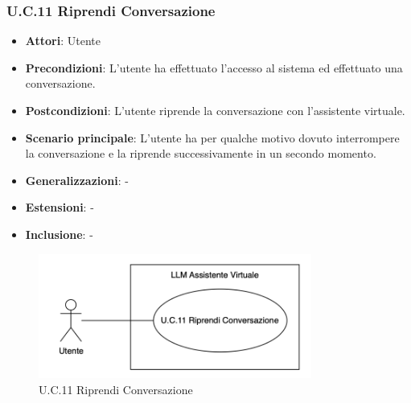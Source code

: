 \subsubsection{U.C.11 Riprendi Conversazione}
\begin{itemize}
    \item \textbf{Attori}: Utente
    \item \textbf{Precondizioni}: L’utente ha effettuato l’accesso al sistema ed effettuato una conversazione.
    \item \textbf{Postcondizioni}: L’utente riprende la conversazione con l’assistente virtuale.
    \item \textbf{Scenario principale}: L’utente ha per qualche motivo dovuto interrompere la conversazione e la riprende successivamente in un secondo momento.
    \item \textbf{Generalizzazioni}: -
    \item \textbf{Estensioni}: -
    \item \textbf{Inclusione}: -
\end{itemize}
\begin{figure}[H]
    \centering
    \includegraphics[width=0.8\textwidth]{img/UC11.png}
    \caption{U.C.11 Riprendi Conversazione}
\end{figure}
\newpage

